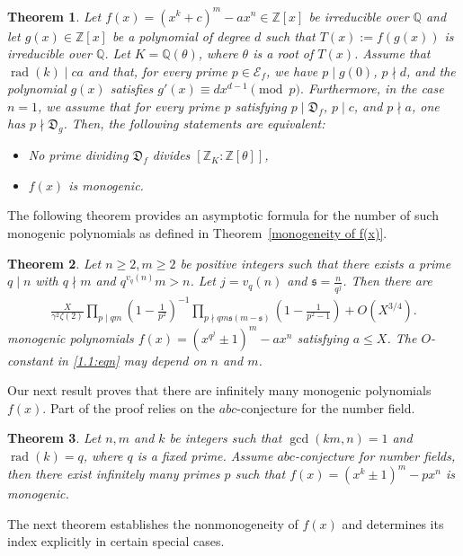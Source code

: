 \documentclass[table]{amsart}
\newcommand{\sfrak}{\mathfrak{s}}
\newcommand{\scrE}{\mathscr{E}}
\newtheorem{theorem}{Theorem}[section]
\newcommand{\rad}{\operatorname{rad}}
\newcommand{\Z}{\mathbb{Z}}
\newcommand{\D}{\mathfrak{D}}
\numberwithin{equation}{section}
\begin{document}
 \begin{theorem}\label{monogeneity of f(g(x))}
    Let $f(x) = (x^k+c)^m-ax^n\in \mathbb{Z}[x]$ be irreducible over $\mathbb{Q}$ and let  $g(x)\in \Z[x]$ be a polynomial of degree $d$ such that \(T(x) := f(g(x))\) is irreducible over $\mathbb{Q}$.  Let $K = \mathbb{Q}(\theta)$, where $\theta$ is a root of $T(x)$. Assume that $\rad(k)\mid ca$ and that, for every prime $p \in \scrE_f$, 
we have $p \mid g(0)$, $p \nmid d$, and the polynomial $g(x)$ satisfies \( g'(x) \equiv d x^{d-1} \pmod{p}.\) Furthermore, in the case $n = 1$, we assume that for every prime $p$ satisfying 
$p \mid \D_f$, $p \mid c$, and $p \nmid a$, one has $p \nmid \D_g$.
 Then, the following statements are equivalent:
   \begin{itemize}
    \item[1.] No prime dividing $\D_f$ divides $[\Z_K:\Z[\theta]]$,
    \item[2.] $f(x)$ is monogenic.
\end{itemize}
    \end{theorem}
The following theorem provides an asymptotic formula for the number of such monogenic polynomials as defined in Theorem~\ref{monogeneity of f(x)}.

\begin{theorem} \label{1.1:thm}
        Let $n \geq 2,m \geq 2$ be positive integers such that there exists a prime $q \mid n$ with $q \nmid m$ and $q^{v_q(n)}m > n$. Let $j = v_q(n)$ and  $\sfrak=\frac{n}{q^j}$. Then there are
        \begin{align} \label{1.1:eqn}
            \frac{X}{\gamma^2 \zeta(2)} \prod_{p \mid qm} \left( 1- \frac{1}{p^2}\right)^{-1} \prod_{p \nmid qm\sfrak (m-\sfrak)} \left( 1-\frac{1}{p^2-1} \right) + O(X^{3/4}).
        \end{align}
        monogenic polynomials $f(x)= (x^{q^j}\pm 1)^{m} - ax^n$ satisfying $a \leq X$. The $O$-constant in \eqref{1.1:eqn} may depend on $n$ and $m$.
\end{theorem}
 Our next result proves that there are infinitely many monogenic polynomials $f(x)$. Part of the proof relies on the $abc$-conjecture for the number field. 
\begin{theorem} \label{2.10:thm}
    Let $n,m$ and $k$ be integers such that $\gcd(km,n)=1$ and $\rad(k)=q$, where $q$ is a fixed prime. Assume $abc$-conjecture for number fields, then there exist infinitely many primes $p$ such that $f(x) = (x^k \pm 1)^m - p x^n$ is monogenic. 
\end{theorem}
The next theorem establishes the nonmonogeneity of $f(x)$ and determines its index explicitly in certain special cases.
\end{document}
